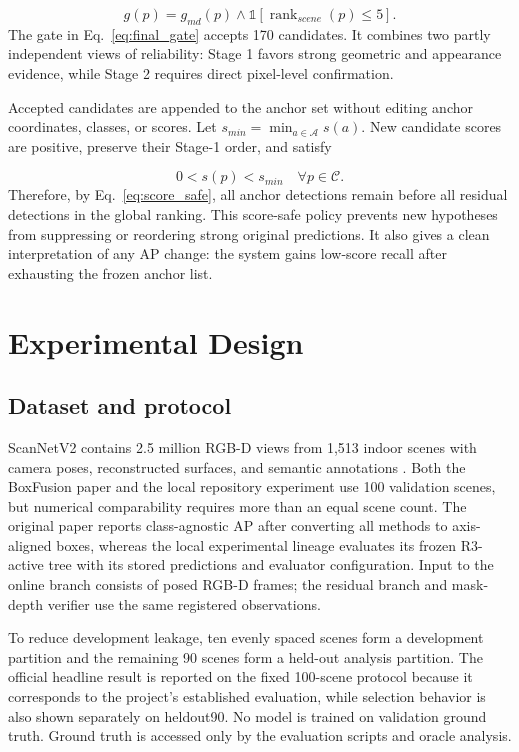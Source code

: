 \documentclass[11pt,a4paper]{article}
\begin{document}
\begin{equation}
g(p)=g_{md}(p)\land \mathbb{1}[\operatorname{rank}_{scene}(p)\le 5].
\label{eq:final_gate}
\end{equation}
The gate in Eq.~\eqref{eq:final_gate} accepts 170 candidates. It combines two partly independent views of reliability: Stage 1 favors strong geometric and appearance evidence, while Stage 2 requires direct pixel-level confirmation.

Accepted candidates are appended to the anchor set without editing anchor coordinates, classes, or scores. Let \(s_{min}=\min_{a\in\mathcal{A}}s(a)\). New candidate scores are positive, preserve their Stage-1 order, and satisfy

\begin{equation}
0<s(p)<s_{min}\quad \forall p\in\mathcal{C}.
\label{eq:score_safe}
\end{equation}
Therefore, by Eq.~\eqref{eq:score_safe}, all anchor detections remain before all residual detections in the global ranking. This score-safe policy prevents new hypotheses from suppressing or reordering strong original predictions. It also gives a clean interpretation of any AP change: the system gains low-score recall after exhausting the frozen anchor list.

\section{Experimental Design}
\subsection{Dataset and protocol}
ScanNetV2 contains 2.5 million RGB-D views from 1,513 indoor scenes with camera poses, reconstructed surfaces, and semantic annotations \cite{dai2017scannet}. Both the BoxFusion paper and the local repository experiment use 100 validation scenes, but numerical comparability requires more than an equal scene count. The original paper reports class-agnostic AP after converting all methods to axis-aligned boxes, whereas the local experimental lineage evaluates its frozen R3-active tree with its stored predictions and evaluator configuration. Input to the online branch consists of posed RGB-D frames; the residual branch and mask-depth verifier use the same registered observations.

To reduce development leakage, ten evenly spaced scenes form a development partition and the remaining 90 scenes form a held-out analysis partition. The official headline result is reported on the fixed 100-scene protocol because it corresponds to the project's established evaluation, while selection behavior is also shown separately on heldout90. No model is trained on validation ground truth. Ground truth is accessed only by the evaluation scripts and oracle analysis.
\end{document}
